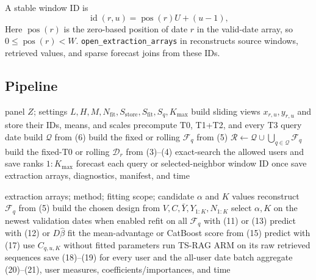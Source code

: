 \documentclass[11pt]{article}
\newcommand{\Nfit}{N_{\mathrm{fit}}}
\newcommand{\Sstore}{S_{\mathrm{store}}}
\newcommand{\Sfit}{S_{\mathrm{fit}}}
\newcommand{\Sq}{S_q}
\newcommand{\Kmax}{K_{\max}}
\begin{document}
A stable window ID is
\[
 \operatorname{id}(r,u)=\operatorname{pos}(r)U+(u-1),         \tag{22}
\]
Here $\operatorname{pos}(r)$ is the zero-based position of date $r$ in the
valid-date array, so $0\le\operatorname{pos}(r)<W$.
\texttt{open\_extraction\_arrays} in
 reconstructs source windows, retrieved values,
and sparse forecast joins from these IDs.

\subsection{Pipeline}

\begin{algorithm}[H]
\caption{Extraction}
\footnotesize
\begin{algorithmic}[1]
\Require panel $Z$; settings $L,H,M,\Nfit,\Sstore,\Sfit,\Sq,\Kmax$
\State build sliding views $x_{r,u},y_{r,u}$ and store their IDs, means, and scales
\State precompute T0, T1+T2, and every T3 query date
\State build $\mathcal Q$ from (6)
  \State build the fixed or rolling $\mathcal F_q$ from (5)
\EndFor
\State $\mathcal R\gets\mathcal Q\cup\bigcup_{q\in\mathcal Q}\mathcal F_q$
  \State build the fixed-T0 or rolling $\mathcal D_r$ from (3)--(4)
    \State exact-search the allowed users and save ranks $1{:}\Kmax$
  \EndFor
\EndFor
\State forecast each query or selected-neighbor window ID once
\State save extraction arrays, diagnostics, manifest, and time
\end{algorithmic}
\end{algorithm}

\begin{algorithm}[H]
\caption{Adaptation and evaluation}
\footnotesize
\begin{algorithmic}[1]
\Require extraction arrays; method; fitting scope; candidate $\alpha$ and $K$ values
  \State reconstruct $\mathcal F_q$ from (5)
    \State build the chosen design from $V,C,\bar Y,Y_{1:K},N_{1:K}$
    \State select $\alpha,K$ on the newest validation dates when enabled
    \State refit on all $\mathcal F_q$ with (11) or (13)
    \State predict with (12) or $D\widehat\beta$
    \State fit the mean-advantage or CatBoost score from (15)
    \State predict with (17)
    \State use $C_{q,u,K}$ without fitted parameters
  \Else
    \State run TS-RAG ARM on its raw retrieved sequences
  \EndIf
  \State save (18)--(19) for every user and the all-user date batch
\EndFor
\State aggregate (20)--(21), user measures, coefficients/importances, and time
\end{algorithmic}
\end{algorithm}
\end{document}
